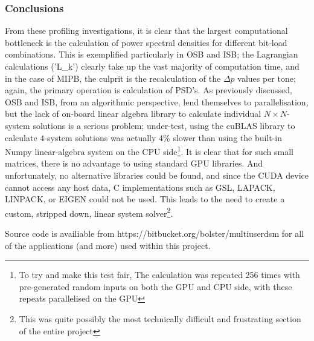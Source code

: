 \subsubsection{Conclusions}
From these profiling investigations, it is clear that the largest computational bottleneck is the calculation of power spectral densities for different bit-load combinations. This is exemplified particularly in OSB and ISB; the Lagrangian calculations ('L\_k') clearly take up the vast majority of computation time, and in the case of MIPB, the culprit is the recalculation of the \(\Delta p\) values per tone; again, the primary operation is calculation of PSD's. As previously discussed, OSB and ISB, from an algorithmic perspective, lend themselves to parallelisation, but the lack of on-board linear algebra library to calculate individual \(N\times N\)-system solutions is a serious problem; under-test, using the cuBLAS library to calculate \(4\)-system solutions was actually 4\% slower than using the built-in Numpy linear-algebra system on the CPU side\footnote{To try and make this test fair, The calculation was repeated 256 times with pre-generated random inputs on both the GPU and CPU side, with these repeats parallelised on the GPU}. It is clear that for such small matrices, there is no advantage to using standard GPU libraries. And unfortunately, no alternative libraries could be found, and since the CUDA device cannot access any host data, C implementations such as GSL, LAPACK, LINPACK, or EIGEN could not be used.
This leads to the need to create a custom, stripped down, linear system solver\footnote{This was quite possibly the most technically difficult and frustrating section of the entire project}.

Source code is availiable from https://bitbucket.org/bolster/multiuserdsm for all of the applications (and more) used within this project.

